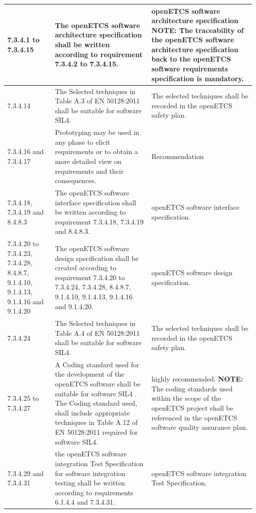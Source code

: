 \documentclass{template/openetcs_report}
\begin{document}
{\begin{longtable}{|p{2cm}|p{9cm}|p{3cm}|}
7.3.4.1 to 7.3.4.15 & The openETCS software architecture specification shall be written according to requirement 7.3.4.2 to 7.3.4.15.& openETCS software architecture specification
\linebreak
\linebreak
NOTE: \linebreak
The traceability of the openETCS software architecture specification back to the openETCS software requirements specification is mandatory.\\ 
\hline
7.3.4.14 & The Selected techniques in Table A.3 of EN 50128:2011 shall be suitable for software SIL4.
& The selected techniques shall be recorded in the openETCS safety plan.\\
\hline
7.3.4.16 and 7.3.4.17 & Prototyping may be used in any phase to elicit requirements or to obtain a more detailed view on requirements and their consequences.& Recommendation\\ 
\hline
7.3.4.18, 7.3.4.19 and 8.4.8.3 & The openETCS software interface specification shall be written according to requirement 7.3.4.18, 7.3.4.19 and 8.4.8.3. & openETCS software interface specification.\\ 
\hline
7.3.4.20 to 7.3.4.23, 7.3.4.28, 8.4.8.7, 9.1.4.10, 9.1.4.13, 9.1.4.16 and 9.1.4.20
& The openETCS software design specification shall be created according to requirement 7.3.4.20 to 7.3.4.24, 7.3.4.28, 8.4.8.7, 9.1.4.10, 9.1.4.13, 9.1.4.16 and 9.1.4.20. & openETCS software design specification.\\
\hline
7.3.4.24 & The Selected techniques in Table A.4 of EN 50128:2011 shall be suitable for software SIL4.
& The selected techniques shall be recorded in the openETCS safety plan.\\ 
\hline
7.3.4.25 to 7.3.4.27 & A Coding standard used for the development of the openETCS software shall be suitable for software SIL4 .
\linebreak
The Coding standard used, shall include appropriate techniques in Table A.12 of EN 50128:2011 required for software SIL4.
& 
highly recommended.
\linebreak
\textbf{NOTE:} \linebreak
The coding standards used within the scope of the openETCS project shall be referenced in the openETCS software quality assurance plan.\\ 
\hline
7.3.4.29 and 7.3.4.31 & the openETCS software integration Test Specification for software integration testing shall be written according to requirements 6.1.4.4 and 7.3.4.31. & openETCS software integration Test Specification.\\ 

\end{longtable}}
\end{document}
